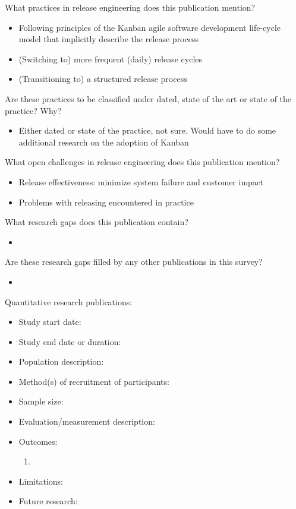 \documentclass[]{book}
\providecommand{\tightlist}{%
  \setlength{\itemsep}{0pt}\setlength{\parskip}{0pt}}
\begin{document}
What practices in release engineering does this publication mention?

\begin{itemize}
\tightlist
\item
  Following principles of the Kanban agile software development
  life-cycle model that implicitly describe the release process
\item
  (Switching to) more frequent (daily) release cycles
\item
  (Transitioning to) a structured release process
\end{itemize}

Are these practices to be classified under dated, state of the art or
state of the practice? Why?

\begin{itemize}
\tightlist
\item
  Either dated or state of the practice, not sure. Would have to do some
  additional research on the adoption of Kanban
\end{itemize}

What open challenges in release engineering does this publication
mention?

\begin{itemize}
\tightlist
\item
  Release effectiveness: minimize system failure and customer impact
\item
  Problems with releasing encountered in practice
\end{itemize}

What research gaps does this publication contain?

\begin{itemize}
\item
\end{itemize}

Are these research gaps filled by any other publications in this survey?

\begin{itemize}
\item
\end{itemize}

Quantitative research publications:

\begin{itemize}
\tightlist
\item
  Study start date:
\item
  Study end date or duration:
\item
  Population description:
\item
  Method(s) of recruitment of participants:
\item
  Sample size:
\item
  Evaluation/measurement description:
\item
  Outcomes:

  \begin{enumerate}
  \def\labelenumi{\arabic{enumi}.}
  \item
  \end{enumerate}
\item
  Limitations:
\item
  Future research:
\end{itemize}
\end{document}

